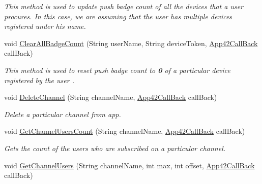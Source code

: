 \begin{DoxyCompactItemize}
\begin{DoxyCompactList}\small\item\em This method is used to update push badge count of all the devices that a user procures. In this case, we are assuming that the user has multiple devices registered under his name. \end{DoxyCompactList}\item 
void \hyperlink{classcom_1_1shephertz_1_1app42_1_1paas_1_1sdk_1_1csharp_1_1push_notification_1_1_push_notification_service_a457a4474fdb4718c823ad58908baa20e}{Clear\+All\+Badge\+Count} (String user\+Name, String device\+Token, \hyperlink{interfacecom_1_1shephertz_1_1app42_1_1paas_1_1sdk_1_1csharp_1_1_app42_call_back}{App42\+Call\+Back} call\+Back)
\begin{DoxyCompactList}\small\item\em This method is used to reset push badge count to {\bfseries 0} of a particular device registered by the user . \end{DoxyCompactList}\item 
void \hyperlink{classcom_1_1shephertz_1_1app42_1_1paas_1_1sdk_1_1csharp_1_1push_notification_1_1_push_notification_service_a3c7157cea66979eab6222c605598ba95}{Delete\+Channel} (String channel\+Name, \hyperlink{interfacecom_1_1shephertz_1_1app42_1_1paas_1_1sdk_1_1csharp_1_1_app42_call_back}{App42\+Call\+Back} call\+Back)
\begin{DoxyCompactList}\small\item\em Delete a particular channel from app. \end{DoxyCompactList}\item 
void \hyperlink{classcom_1_1shephertz_1_1app42_1_1paas_1_1sdk_1_1csharp_1_1push_notification_1_1_push_notification_service_a7fa0a30e5904d6e31790cce98039119f}{Get\+Channel\+Users\+Count} (String channel\+Name, \hyperlink{interfacecom_1_1shephertz_1_1app42_1_1paas_1_1sdk_1_1csharp_1_1_app42_call_back}{App42\+Call\+Back} call\+Back)
\begin{DoxyCompactList}\small\item\em Gets the count of the users who are subscribed on a particular channel. \end{DoxyCompactList}\item 
void \hyperlink{classcom_1_1shephertz_1_1app42_1_1paas_1_1sdk_1_1csharp_1_1push_notification_1_1_push_notification_service_a805782a29e900015f633c272c1a23907}{Get\+Channel\+Users} (String channel\+Name, int max, int offset, \hyperlink{interfacecom_1_1shephertz_1_1app42_1_1paas_1_1sdk_1_1csharp_1_1_app42_call_back}{App42\+Call\+Back} call\+Back)

\end{DoxyCompactItemize}
